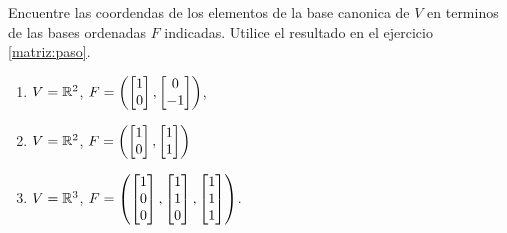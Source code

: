 \begin{resuelto}
 Encuentre las coordendas de los elementos de la base canonica de $V$ en terminos de las bases ordenadas $F$ indicadas.
Utilice el resultado en el ejercicio \ref{matriz:paso}.
 \begin{enumerate}
  \item $V=\mathbb{R}^{2}$, $F=\left(\begin{bmatrix}1\\0\end{bmatrix},\begin{bmatrix}0\\-1\end{bmatrix}\right)$,
  \item $V=\mathbb{R}^{2}$, $F=\left(\begin{bmatrix}1\\0\end{bmatrix},\begin{bmatrix}1\\1\end{bmatrix}\right)$
  \item $V=\mathbb{R}^{3}$, $F=\left(\begin{bmatrix}1\\0\\0\end{bmatrix},\begin{bmatrix}1\\1\\0\end{bmatrix},\begin{bmatrix}1\\1\\1\end{bmatrix}\right)$.
 \end{enumerate}
\end{resuelto}

